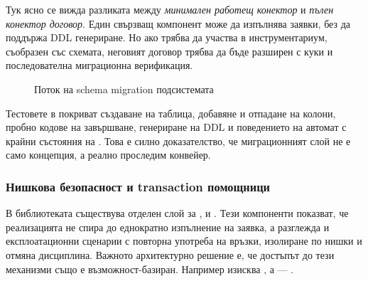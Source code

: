 Тук ясно се вижда разликата между \emph{минимален работещ конектор} и \emph{пълен конектор договор}. Един свързващ компонент може да изпълнява заявки, без да поддържа DDL генериране. Но ако трябва да участва в инструментариум, съобразен със схемата, неговият договор трябва да бъде разширен с  куки и последователна миграционна верификация.

\begin{figure}[H]
\centering
{}
\caption{Поток на schema migration подсистемата}
\label{fig:migration_pipeline}
\end{figure}

Тестовете в  покриват създаване на таблица, добавяне и отпадане на колони, пробно кодове на завършване, генериране на DDL и поведението на автомат с крайни състояния на . Това е силно доказателство, че миграционният слой не е само концепция, а реално проследим конвейер.

\subsubsection{Нишкова безопасност и transaction помощници}

В библиотеката съществува отделен слой за ,  и . Тези компоненти показват, че реализацията не спира до еднократно изпълнение на заявка, а разглежда и експлоатационни сценарии с повторна употреба на връзки, изолиране по нишки и отмяна дисциплина. Важното архитектурно решение е, че достъпът до тези механизми също е възможност-базиран. Например  изисква , а  --- .

